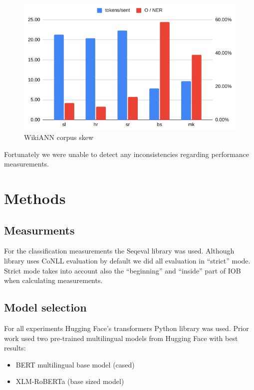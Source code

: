 \documentclass[sigconf]{acmart}
\begin{document}
\begin{figure}[h]
  \label{fig:corpora_analysis}
  \centering
  \includegraphics[width=\linewidth]{wikiann-skew}
  \caption{WikiANN corpus skew}
\end{figure}

Fortunately we were unable to detect any inconsistencies regarding performance measurements.

\section{Methods}
\subsection{Measurments}
For the classification measurements the Seqeval library\cite{seqeval} was used.
Although library uses CoNLL evaluation by default we did all evaluation in ``strict'' mode.
Strict mode takes into account also the ``beginning'' and ``inside'' part of IOB when calculating measurements.

\subsection{Model selection}
For all experiments Hugging Face's transformers Python library\cite{wolf-etal-2020-transformers} was used.
Prior work used two pre-trained multilingual models from Hugging Face with best results:
\begin{itemize}
  \item BERT multilingual base model (cased)\cite{DBLP:journals/corr/abs-1810-04805}
  \item XLM-RoBERTa (base sized model)\cite{DBLP:journals/corr/abs-1911-02116}
\end{itemize}
\end{document}
